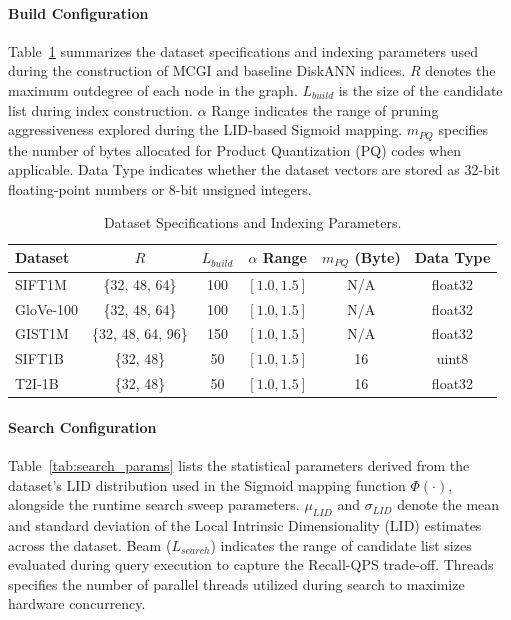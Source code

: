 \documentclass{article}
\theoremstyle{plain}
\theoremstyle{definition}
\theoremstyle{remark}
\begin{document}
\paragraph{Build Configuration}
Table~\ref{tab:build_params} summarizes the dataset specifications and indexing parameters used during the construction of MCGI and baseline DiskANN indices.   $R$ denotes the maximum outdegree of each node in the graph. $L_{build}$ is the size of the candidate list during index construction. $\alpha$ Range indicates the range of pruning aggressiveness explored during the LID-based Sigmoid mapping. $m_{PQ}$ specifies the number of bytes allocated for Product Quantization (PQ) codes when applicable. Data Type indicates whether the dataset vectors are stored as 32-bit floating-point numbers or 8-bit unsigned integers.

\begin{table}[h]
\centering
\caption{Dataset Specifications and Indexing Parameters.}
\label{tab:build_params}
\begin{tabular}{lccccc}
\toprule
Dataset & $R$ & $L_{build}$ & $\alpha$ Range & $m_{PQ}$ (Byte) & Data Type\\
\midrule
SIFT1M    & \{32, 48, 64\} & 100 & $[1.0, 1.5]$ & N/A & float32 \\
GloVe-100 & \{32, 48, 64\} & 100 & $[1.0, 1.5]$ & N/A & float32 \\
GIST1M    & \{32, 48, 64, 96\} & 150 & $[1.0, 1.5]$ & N/A & float32 \\
SIFT1B    & \{32, 48\} & 50  & $[1.0, 1.5]$ & 16  & uint8   \\
T2I-1B    & \{32, 48\} & 50  & $[1.0, 1.5]$ & 16  & float32 \\
\bottomrule
\end{tabular}
\end{table}

\paragraph{Search Configuration}
Table~\ref{tab:search_params} lists the statistical parameters derived from the dataset's LID distribution used in the Sigmoid mapping function $\Phi(\cdot)$, alongside the runtime search sweep parameters. $\mu_{LID}$ and $\sigma_{LID}$ denote the mean and standard deviation of the Local Intrinsic Dimensionality (LID) estimates across the dataset. Beam ($L_{search}$) indicates the range of candidate list sizes evaluated during query execution to capture the Recall-QPS trade-off. Threads specifies the number of parallel threads utilized during search to maximize hardware concurrency. 
\end{document}
